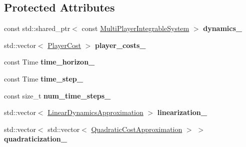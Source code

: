 \subsection*{Protected Attributes}
\begin{DoxyCompactItemize}
\item 
const std\+::shared\+\_\+ptr$<$ const \hyperlink{classilqgames_1_1_multi_player_integrable_system}{Multi\+Player\+Integrable\+System} $>$ {\bfseries dynamics\+\_\+}\hypertarget{classilqgames_1_1_game_solver_addd321f0c2c7a760bccd2e4f043b3725}{}\label{classilqgames_1_1_game_solver_addd321f0c2c7a760bccd2e4f043b3725}

\item 
std\+::vector$<$ \hyperlink{classilqgames_1_1_player_cost}{Player\+Cost} $>$ {\bfseries player\+\_\+costs\+\_\+}\hypertarget{classilqgames_1_1_game_solver_aa9271829f762e9ad732921042005f856}{}\label{classilqgames_1_1_game_solver_aa9271829f762e9ad732921042005f856}

\item 
const Time {\bfseries time\+\_\+horizon\+\_\+}\hypertarget{classilqgames_1_1_game_solver_ae515fafef0ee7df96cfe1447d9f35581}{}\label{classilqgames_1_1_game_solver_ae515fafef0ee7df96cfe1447d9f35581}

\item 
const Time {\bfseries time\+\_\+step\+\_\+}\hypertarget{classilqgames_1_1_game_solver_ae1e0efeb25072ac9f21699b82071c6ab}{}\label{classilqgames_1_1_game_solver_ae1e0efeb25072ac9f21699b82071c6ab}

\item 
const size\+\_\+t {\bfseries num\+\_\+time\+\_\+steps\+\_\+}\hypertarget{classilqgames_1_1_game_solver_a8a95abeb47770462608d2f34b97c974e}{}\label{classilqgames_1_1_game_solver_a8a95abeb47770462608d2f34b97c974e}

\item 
std\+::vector$<$ \hyperlink{structilqgames_1_1_linear_dynamics_approximation}{Linear\+Dynamics\+Approximation} $>$ {\bfseries linearization\+\_\+}\hypertarget{classilqgames_1_1_game_solver_ad31cd30bf0b2fd95461672da928e91f2}{}\label{classilqgames_1_1_game_solver_ad31cd30bf0b2fd95461672da928e91f2}

\item 
std\+::vector$<$ std\+::vector$<$ \hyperlink{structilqgames_1_1_quadratic_cost_approximation}{Quadratic\+Cost\+Approximation} $>$ $>$ {\bfseries quadraticization\+\_\+}\hypertarget{classilqgames_1_1_game_solver_a039a0b26778f15ce89509452b11c5fb2}{}\label{classilqgames_1_1_game_solver_a039a0b26778f15ce89509452b11c5fb2}


\end{DoxyCompactItemize}
